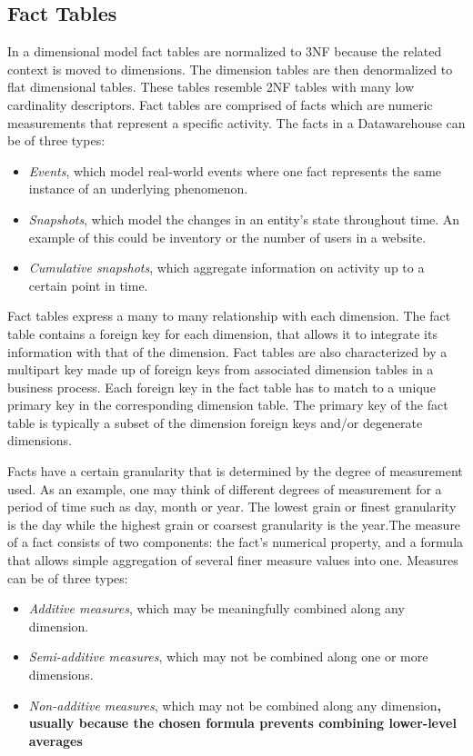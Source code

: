 \documentclass[]{article}
\begin{document}
\subsection{Fact Tables} %
\label{sub:fact_tables}

In a dimensional model fact tables are normalized to 3NF because the related context is moved to dimensions. The dimension tables are
then denormalized to flat dimensional tables. These tables resemble 2NF tables with many low cardinality descriptors. Fact tables are
comprised of facts which are numeric measurements that represent a specific activity. The facts in a Datawarehouse can be of three types:
\begin{itemize}
	\item \emph{Events}, which model real-world events where one fact represents the same instance of an underlying phenomenon. 
	\item \emph{Snapshots}, which model the changes in an entity's state throughout time. An example of this could be inventory or the number of users in a website.
	\item \emph{Cumulative snapshots}, which aggregate information on activity up to a certain point in time.
\end{itemize}
Fact tables express a many to many relationship with each dimension. The fact table contains a foreign key for each dimension, that
allows it to integrate its information with that of the dimension. Fact tables are also characterized by a multipart key made up of
foreign keys from associated dimension tables in a business process. Each foreign key in the fact table has to match to a unique
primary key in the corresponding dimension table. The primary key of the fact table is typically a subset of the dimension foreign keys
and/or degenerate dimensions.

Facts have a certain granularity that is determined by the degree of measurement used. As an example, one may think of different degrees
of measurement for a period of time such as day, month or year. The lowest grain or finest granularity is the day while the highest
grain or coarsest granularity is the year.The measure of a fact consists of two components: the fact's numerical property, and a formula
that allows simple aggregation of several finer measure values into one. Measures can be of three types:
\begin{itemize}
\item \emph{Additive measures}, which may be meaningfully combined along any dimension.
\item \emph{Semi-additive measures}, which may not be combined along one or more dimensions.
\item \emph{Non-additive measures}, which may not be combined along any dimension\textbf{, usually because the chosen formula prevents combining lower-level averages}
\end{itemize}
\end{document}
